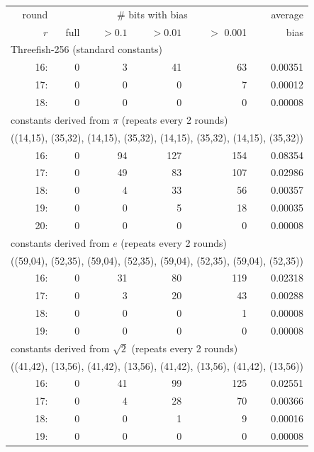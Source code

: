 \documentclass[11pt,twoside]{article}
\begin{document}
\begin{table}[htbp]
  \centering
\begin{tabular}{|r|rrrr|r|}
\hline
round & \multicolumn{ 4}{c|}{\# bits with bias} & average\\
$r$ & \quad full & $>0.1$ & $>0.01$ & $>$ 0.001 & bias \\  \hline \hline
\multicolumn{6}{|l|}{Threefish-256 (standard constants)} \\ 
 16: &  0 &  3 &  41 &  63 & 0.00351  \\
 17: &  0 &  0 &  0 &  7 & 0.00012  \\
 18: &  0 &  0 &  0 &  0 & 0.00008  \\
 \hline\hline
\multicolumn{6}{|l|}{constants derived from $\pi$ (repeats every 2 rounds)} \\ 
\multicolumn{6}{|l|}{((14,15), (35,32), (14,15), (35,32),
                      (14,15), (35,32), (14,15), (35,32))} \\ 
 16: &  0 &  94 &  127 &  154 & 0.08354  \\
 17: &  0 &  49 &  83 &  107 & 0.02986  \\
 18: &  0 &  4 &  33 &  56 & 0.00357  \\
 19: &  0 &  0 &  5 &  18 & 0.00035  \\
 20: &  0 &  0 &  0 &  0 & 0.00008  \\
 \hline\hline
\multicolumn{6}{|l|}{constants derived from $e$ (repeats every 2 rounds)} \\
\multicolumn{6}{|l|}{((59,04), (52,35), (59,04), (52,35),
                      (59,04), (52,35), (59,04), (52,35))} \\
 16: &  0 &  31 &  80 &  119 & 0.02318  \\
 17: &  0 &  3 &  20 &  43 & 0.00288  \\
 18: &  0 &  0 &  0 &  1 & 0.00008  \\
 19: &  0 &  0 &  0 &  0 & 0.00008  \\
 \hline\hline
\multicolumn{6}{|l|}{constants derived from $\sqrt{2}$ (repeats every 2 rounds)} \\ 
\multicolumn{6}{|l|}{((41,42), (13,56), (41,42), (13,56), 
                      (41,42), (13,56), (41,42), (13,56))} \\ 
 16: &  0 &  41 &  99 &  125 & 0.02551  \\
 17: &  0 &  4 &  28 &  70 & 0.00366  \\
 18: &  0 &  0 &  1 &  9 & 0.00016  \\
 19: &  0 &  0 &  0 &  0 & 0.00008  \\

\end{tabular}
\end{table}
\end{document}

